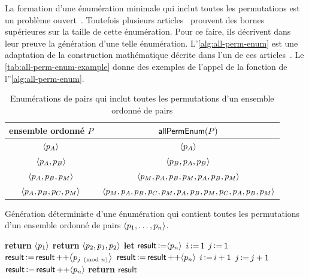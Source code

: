 La formation d'une énumération minimale qui inclut toutes les permutations est un problème ouvert~\autocite{engen2018_containing}.
Toutefois plusieurs articles~\autocite{adleman_1974_shortperm,koutas1975shortest,galbiati1976permutation,zualinescu2011shorter,radomirovic2012construction} prouvent des bornes supérieures sur la taille de cette énumération.
Pour ce faire, ils décrivent dans leur preuve la génération d'une telle énumération.
L'\autoref{alg:all-perm-enum} est une adaptation de la construction mathématique décrite dans l'un de ces articles~\autocite{adleman_1974_shortperm}.
Le \autoref{tab:all-perm-enum-example} donne des exemples de l'appel de la fonction de l''\autoref{alg:all-perm-enum}.

\clearpage

\begin{table}[ht]
    \centering
    \begin{tabular}{cc}
        ensemble ordonné $P$ & $\trm{allPermEnum}(P)$ \\
        \toprule
        $\tuple*{p_A}$ & $\tuple*{p_A}$ \\
        $\tuple*{p_A, p_B}$ & $\tuple*{p_B, p_A, p_B}$ \\
        $\tuple*{p_A, p_B, p_M}$ & $\tuple*{p_M, p_A, p_B, p_M, p_A, p_B, p_M}$ \\
        $\tuple*{p_A, p_B, p_C, p_M}$ & $\tuple*{p_M, p_A, p_B, p_C, p_M, p_A, p_B, p_M, p_C, p_A, p_B, p_M}$ \\
    \end{tabular}
    \caption{Enumérations de pairs qui inclut toutes les permutations d'un ensemble ordonné de pairs}\label{tab:all-perm-enum-example}
\end{table}

\begin{algorithm}[ht]
\caption{Génération déterministe d'une énumération qui contient toutes les permutations d'un ensemble ordonné de pairs $\tuple*{p_1, \dotsc, p_n}$.}\label{alg:all-perm-enum}
\begin{algorithmic}[1]
        \State \textbf{return} $\tuple*{p_1}$
        \State \textbf{return} $\tuple*{p_2, p_1, p_2}$
    \Else{}
        \State \textbf{let} $\trm{result} \assign \tuple*{p_n}$
        \State $i \assign 1$
        \State $j \assign 1$
            \State $\trm{result} \assign \trm{result} \lappend \tuple*{p_{j \pmod{n}}}$
                \State $\trm{result} \assign \trm{result} \lappend \tuple*{p_n}$
                \State $i \assign i + 1$
            \EndIf
            \State $j \assign j + 1$
        \EndWhile
        \State $\trm{result} \assign \trm{result} \lappend \tuple*{p_n}$
        \State \textbf{return} $\trm{result}$
    \EndIf
\EndFunction
\end{algorithmic}
\end{algorithm}


